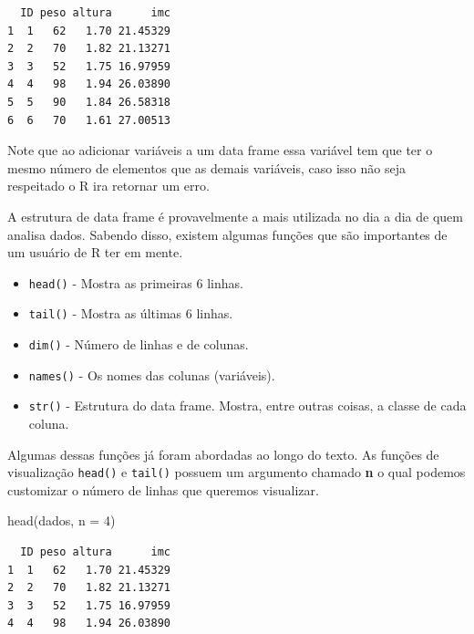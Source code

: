\documentclass[
  letterpaper,
  DIV=11,
  numbers=noendperiod]{scrreprt}
\newenvironment{Shaded}{\begin{snugshade}}{\end{snugshade}}
\newcommand{\AttributeTok}[1]{\textcolor[rgb]{0.40,0.45,0.13}{#1}}
\newcommand{\CommentTok}[1]{\textcolor[rgb]{0.37,0.37,0.37}{#1}}
\newcommand{\ConstantTok}[1]{\textcolor[rgb]{0.56,0.35,0.01}{#1}}
\newcommand{\DecValTok}[1]{\textcolor[rgb]{0.68,0.00,0.00}{#1}}
\newcommand{\FunctionTok}[1]{\textcolor[rgb]{0.28,0.35,0.67}{#1}}
\newcommand{\NormalTok}[1]{\textcolor[rgb]{0.00,0.23,0.31}{#1}}
\newcommand{\OtherTok}[1]{\textcolor[rgb]{0.00,0.23,0.31}{#1}}
\newcommand{\SpecialCharTok}[1]{\textcolor[rgb]{0.37,0.37,0.37}{#1}}
\begin{document}
\begin{Shaded}
\end{Shaded}

\begin{verbatim}
  ID peso altura      imc
1  1   62   1.70 21.45329
2  2   70   1.82 21.13271
3  3   52   1.75 16.97959
4  4   98   1.94 26.03890
5  5   90   1.84 26.58318
6  6   70   1.61 27.00513
\end{verbatim}

Note que ao adicionar variáveis a um data frame essa variável tem que
ter o mesmo número de elementos que as demais variáveis, caso isso não
seja respeitado o R ira retornar um erro.

A estrutura de data frame é provavelmente a mais utilizada no dia a dia
de quem analisa dados. Sabendo disso, existem algumas funções que são
importantes de um usuário de R ter em mente.

\begin{itemize}
\item
  \texttt{head()} - Mostra as primeiras 6 linhas.
\item
  \texttt{tail()} - Mostra as últimas 6 linhas.
\item
  \texttt{dim()} - Número de linhas e de colunas.
\item
  \texttt{names()} - Os nomes das colunas (variáveis).
\item
  \texttt{str()} - Estrutura do data frame. Mostra, entre outras coisas,
  a classe de cada coluna.
\end{itemize}

Algumas dessas funções já foram abordadas ao longo do texto. As funções
de visualização \texttt{head()} e \texttt{tail()} possuem um argumento
chamado \textbf{n} o qual podemos customizar o número de linhas que
queremos visualizar.

\begin{Shaded}
\begin{Highlighting}[]
\FunctionTok{head}\NormalTok{(dados, }\AttributeTok{n =} \DecValTok{4}\NormalTok{)}
\end{Highlighting}
\end{Shaded}

\begin{verbatim}
  ID peso altura      imc
1  1   62   1.70 21.45329
2  2   70   1.82 21.13271
3  3   52   1.75 16.97959
4  4   98   1.94 26.03890
\end{verbatim}
\end{document}

